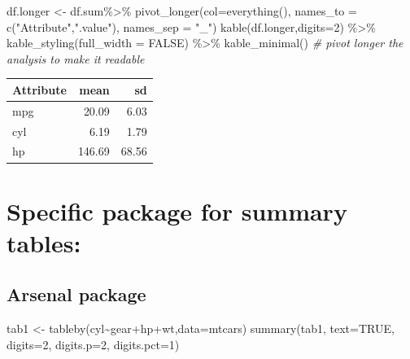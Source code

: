 \documentclass[
]{book}
\newenvironment{Shaded}{\begin{snugshade}}{\end{snugshade}}
\newcommand{\AttributeTok}[1]{\textcolor[rgb]{0.77,0.63,0.00}{#1}}
\newcommand{\CommentTok}[1]{\textcolor[rgb]{0.56,0.35,0.01}{\textit{#1}}}
\newcommand{\ConstantTok}[1]{\textcolor[rgb]{0.00,0.00,0.00}{#1}}
\newcommand{\DecValTok}[1]{\textcolor[rgb]{0.00,0.00,0.81}{#1}}
\newcommand{\FunctionTok}[1]{\textcolor[rgb]{0.00,0.00,0.00}{#1}}
\newcommand{\NormalTok}[1]{#1}
\newcommand{\OtherTok}[1]{\textcolor[rgb]{0.56,0.35,0.01}{#1}}
\newcommand{\SpecialCharTok}[1]{\textcolor[rgb]{0.00,0.00,0.00}{#1}}
\newcommand{\StringTok}[1]{\textcolor[rgb]{0.31,0.60,0.02}{#1}}
\begin{document}
\begin{Shaded}
\begin{Highlighting}[]
\NormalTok{df.longer }\OtherTok{\textless{}{-}}\NormalTok{ df.sum}\SpecialCharTok{\%\textgreater{}\%} \FunctionTok{pivot\_longer}\NormalTok{(}\AttributeTok{col=}\FunctionTok{everything}\NormalTok{(),  }
\AttributeTok{names\_to =} \FunctionTok{c}\NormalTok{(}\StringTok{"Attribute"}\NormalTok{,}\StringTok{".value"}\NormalTok{),}
  \AttributeTok{names\_sep =} \StringTok{"\_"}\NormalTok{)}
\FunctionTok{kable}\NormalTok{(df.longer,}\AttributeTok{digits=}\DecValTok{2}\NormalTok{) }\SpecialCharTok{\%\textgreater{}\%}
  \FunctionTok{kable\_styling}\NormalTok{(}\AttributeTok{full\_width =} \ConstantTok{FALSE}\NormalTok{) }\SpecialCharTok{\%\textgreater{}\%}
  \FunctionTok{kable\_minimal}\NormalTok{() }\CommentTok{\# pivot longer the analysis to make it readable}
\end{Highlighting}
\end{Shaded}

\begin{table}
\centering
\begin{tabular}{l|r|r}
\hline
Attribute & mean & sd\\
\hline
mpg & 20.09 & 6.03\\
\hline
cyl & 6.19 & 1.79\\
\hline
hp & 146.69 & 68.56\\
\hline
\end{tabular}
\end{table}

\hypertarget{specific-package-for-summary-tables}{%
\section{Specific package for summary tables:}\label{specific-package-for-summary-tables}}

\hypertarget{arsenal-package}{%
\subsection{Arsenal package}\label{arsenal-package}}

\begin{Shaded}
\begin{Highlighting}[]
\NormalTok{tab1 }\OtherTok{\textless{}{-}} \FunctionTok{tableby}\NormalTok{(cyl}\SpecialCharTok{\textasciitilde{}}\NormalTok{gear}\SpecialCharTok{+}\NormalTok{hp}\SpecialCharTok{+}\NormalTok{wt,}\AttributeTok{data=}\NormalTok{mtcars)}
\FunctionTok{summary}\NormalTok{(tab1, }\AttributeTok{text=}\ConstantTok{TRUE}\NormalTok{, }\AttributeTok{digits=}\DecValTok{2}\NormalTok{, }\AttributeTok{digits.p=}\DecValTok{2}\NormalTok{, }\AttributeTok{digits.pct=}\DecValTok{1}\NormalTok{)}
\end{Highlighting}
\end{Shaded}
\end{document}
